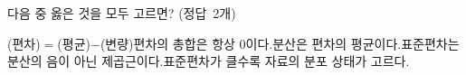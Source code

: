 다음 중 옳은 것을 모두 고르면? \mbox{(정답 2개)}
\begin{choicesv}{(편차)$=$(평균)$-$(변량)}{편차의 총합은 항상 0이다.}{분산은 편차의 평균이다.}{표준편차는 분산의 음이 아닌 제곱근이다.}{표준편차가 클수록 자료의 분포 상태가 고르다.}\end{choicesv}
